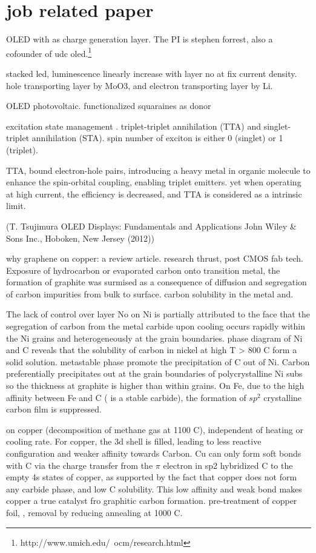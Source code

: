 \section{job related paper}

OLED with  as charge generation layer. \cite{Kanno2006} The PI is stephen forrest, also a cofounder of udc oled.\footnote{http://www.umich.edu/~ocm/research.html}

stacked led, luminescence linearly increase with layer no at fix current density. hole transporting layer by MoO3, and electron transporting layer by Li.

OLED photovoltaic.\cite{Xiao2012a} functionalized squaraines as donor

excitation state management \cite{Zhang2012b}.
triplet-triplet annihilation (TTA) and singlet-triplet annihilation (STA). spin number of exciton is either 0 (singlet) or 1 (triplet).

TTA, bound electron-hole pairs, introducing a heavy metal in organic molecule to enhance the spin-orbital coupling, enabling triplet emitters.\cite{Zhang2013i} yet when operating at high current, the efficiency is decreased, and TTA is considered as a intrinsic limit.


(T. Tsujimura OLED Displays: Fundamentals and Applications John Wiley \& Sons Inc., Hoboken, New Jersey (2012))

why graphene on copper: a review article. \cite{Mattevi2011} research thrust, post CMOS fab tech. Exposure of hydrocarbon or evaporated carbon onto transition metal, the formation of graphite was surmised as a consequence of diffusion and segregation of carbon impurities from bulk to surface. carbon solubility in the metal and. 

The lack of control over layer No on Ni is partially attributed to the face that the segregation of carbon from the metal carbide upon cooling occurs rapidly within the Ni grains and heterogeneously at the grain boundaries. phase diagram of Ni and C reveals that the solubility of carbon in nickel at high T > 800 C form a solid solution. metastable phase  promote the precipitation of C out of Ni. Carbon preferentially precipitates out at the grain boundaries of polycrystalline Ni subs so the thickness at graphite is higher than within grains. On Fe, due to the high affinity between Fe and C ( is a stable carbide), the formation of $sp^2$ crystalline carbon film is suppressed. 

on copper (decomposition of methane gas at 1100 C), independent of heating or cooling rate. For copper, the 3d shell is filled, leading to less reactive configuration and weaker affinity towards Carbon. Cu can only form soft bonds with C via the charge transfer from the $\pi$ electron in  sp2 hybridized C to the empty 4s states of copper, as supported by the fact that copper does not form any carbide phase, and low C solubility. This low affinity and weak bond makes copper a true catalyst fro graphitic carbon formation. pre-treatment of copper foil, ,  removal by reducing annealing at 1000 C. 

